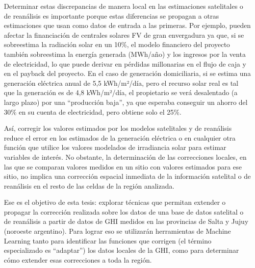 Determinar estas discrepancias de manera local en las estimaciones satelitales o de reanálisis es importante porque estas diferencias se propagan a otras estimaciones que usan como datos de entrada a las primeras. Por ejemplo, pueden afectar la financiación de centrales solares FV de gran envergadura ya que, si se sobreestima la radiación solar en un 10\%, el modelo financiero del proyecto también sobreestima la energía generada (MWh/año) y los ingresos por la venta de electricidad, lo que puede derivar en pérdidas millonarias en el flujo de caja y en el payback del proyecto. En el caso de generación domiciliaria, si se estima una generación eléctrica anual de 5,5 kWh/m²/día, pero el recurso solar real es tal que la generación es de 4,8 kWh/m²/día, el propietario se verá desalentado (a largo plazo) por una “producción baja”, ya que esperaba conseguir un ahorro del 30\% en su cuenta de electricidad, pero obtiene solo el 25\%.


Así, corregir los valores estimados por los modelos satelitales y de reanálisis reduce el error en los estimados de la generación eléctrica o en cualquier otra función que utilice los valores modelados de irradiancia solar para estimar variables de interés. No obstante, la determinación de las correcciones locales, en las que se comparan valores medidos en un sitio con valores estimados para ese sitio, no implica una corrección espacial inmediata de la información satelital o de reanálisis en el resto de las celdas de la región analizada.

Ese es el objetivo de esta tesis: explorar técnicas que permitan extender o propagar la corrección realizada sobre los datos de una base de datos satelital o de reanálisis a partir de datos de GHI medidos en las provincias de Salta y Jujuy (noroeste argentino). Para lograr eso se utilizarán herramientas de Machine Learning tanto para identificar las funciones que corrigen (el término especializado es “adaptar”) los datos locales de la GHI, como para determinar cómo extender esas correcciones a toda la región.


